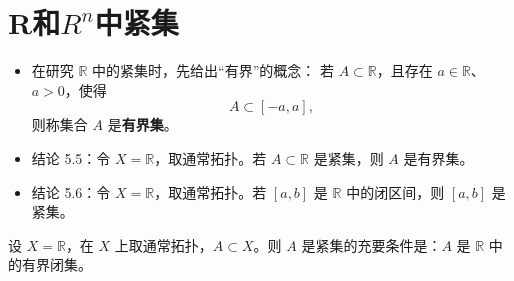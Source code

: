 \section{R和$R^n$中紧集}
\begin{itemize}
  \item 在研究 $\mathbb{R}$ 中的紧集时，先给出“有界”的概念：  
  若 $A\subset\mathbb{R}$，且存在 $a\in\mathbb{R}$、$a>0$，使得
  \[
    A\subset[-a,a],
  \]
  则称集合 $A$ 是\textbf{有界集}。
  

  \item 结论 5.5：令 $X=\mathbb{R}$，取通常拓扑。若 $A\subset\mathbb{R}$ 是紧集，则 $A$ 是有界集。

  \item 结论 5.6：令 $X=\mathbb{R}$，取通常拓扑。若 $[a,b]$ 是 $\mathbb{R}$ 中的闭区间，则 $[a,b]$ 是紧集。
\end{itemize}
\begin{theorem}[R中紧=有界闭集]
设 $X=\mathbb{R}$，在 $X$ 上取通常拓扑，$A\subset X$。则 $A$ 是紧集的充要条件是：$A$ 是 $\mathbb{R}$ 中的有界闭集。
\end{theorem}

